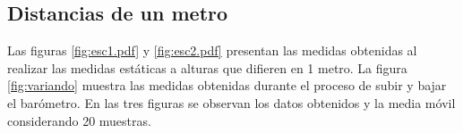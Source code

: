 \documentclass[main]{subfiles}
\begin{document}
\vspace{-10pt}
\begin{figure}[h!]
\centering
{}
  \caption{}
\vspace{-20pt}
\end{figure}

\subsection{Distancias de un metro}

Las figuras \ref{fig:esc1.pdf} y \ref{fig:esc2.pdf} presentan las medidas obtenidas al realizar las medidas est\'aticas a alturas que difieren en 1 metro. La figura \ref{fig:variando} muestra las medidas obtenidas durante el proceso de subir y bajar el bar\'ometro. En las tres figuras se observan los datos obtenidos y la media m\'ovil considerando 20 muestras.
\end{document}
